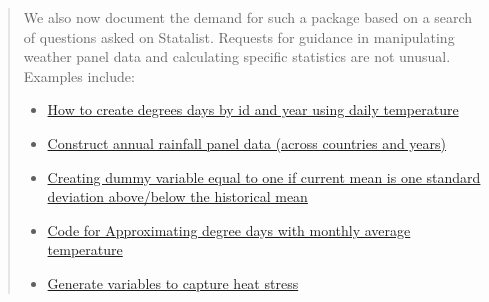 \documentclass{article}[11pt]
\begin{document}
\begin{enumerate}
\begin{quote}
        We also now document the demand for such a package based on a search of questions asked on Statalist. Requests for guidance in manipulating weather panel data and calculating specific statistics are not unusual. Examples include:
        \begin{itemize}
            \item \href{https://www.statalist.org/forums/forum/general-stata-discussion/general/1416861-how-to-create-degrees-days-by-id-and-year-using-daily-temperature}{How to create degrees days by id and year using daily temperature}
            \item \href{https://www.statalist.org/forums/forum/general-stata-discussion/general/1437900-construct-annual-rainfall-panel-data-across-countries-and-years}{Construct annual rainfall panel data (across countries and years)}
            \item \href{https://www.statalist.org/forums/forum/general-stata-discussion/general/1636574-creating-dummy-variable-equal-to-one-if-current-mean-is-one-standard-deviation-above-below-the-historical-mean}{Creating dummy variable equal to one if current mean is one standard deviation above/below the historical mean}
            \item \href{https://www.statalist.org/forums/forum/general-stata-discussion/general/1584175-code-for-approximating-degree-days-with-monthly-average-temperature}{Code for Approximating degree days with monthly average temperature}
            \item \href{https://www.statalist.org/forums/forum/general-stata-discussion/general/1530924-generate-variables-to-capture-heat-stress}{Generate variables to capture heat stress}
        \end{itemize}
    \end{quote}


\end{enumerate}
\end{document}
